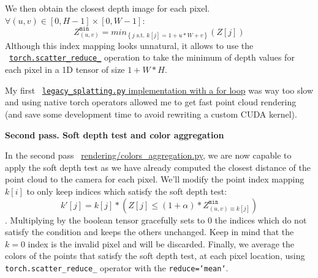 We then obtain the closest depth image for each pixel. $\forall (u,v) \in \left[0, H-1\right] \times \left[0, W-1\right]$:
$$Z^{\texttt{min}}_{(u,v)} = min_{\left\{j  \text{ s.t. } k[j]=1+u*W+v\right\}} \left(Z[j]\right)$$
\noindent Although this index mapping looks unnatural, it allows to use the ~\href{https://pytorch.org/docs/stable/generated/torch.Tensor.scatter\_reduce\_.html#torch.Tensor.scatter\_reduce\_}{\texttt{torch.scatter\_reduce\_}} operation to take the minimum of depth values for each pixel in a 1D tensor of size $1+W*H$.

My first ~\href{https://github.com/balthazarneveu/per-pixel-point-rendering/blob/main/src/pixr/rendering/legacy\_splatting.py}{\texttt{legacy\_splatting.py} implementation with a for loop} was way too slow and using native torch operators allowed me to get fast point cloud rendering (and save some development time to avoid rewriting a custom CUDA kernel).

\noindent \textbf{Second pass. Soft depth test and color aggregation}

In the second pass  ~\href{https://github.com/balthazarneveu/per-pixel-point-rendering/blob/main/src/pixr/rendering/colors\_aggregation.py}{rendering/colors\_aggregation.py}, we are now capable to apply the soft depth test as we have already computed the closest distance of the point cloud to the camera for each pixel. We'll modify the point index mapping $k[i]$ to only keep indices which satisfy the soft depth test: 
$$ k'[j] = k[j] * \left(Z[j] \leq (1+\alpha) *Z^{\texttt{min}}_{(u,v) \equiv k[j]}\right)$$.
Multiplying by the boolean tensor gracefully sets to 0 the indices which do not satisfy the condition and keeps the others unchanged. Keep in mind that the $k=0$ index is the invalid pixel and will be discarded.
Finally, we average the colors of the points that satisfy the soft depth test, at each pixel location, using \texttt{torch.scatter\_reduce\_} operator with the \texttt{reduce=`mean`}.

